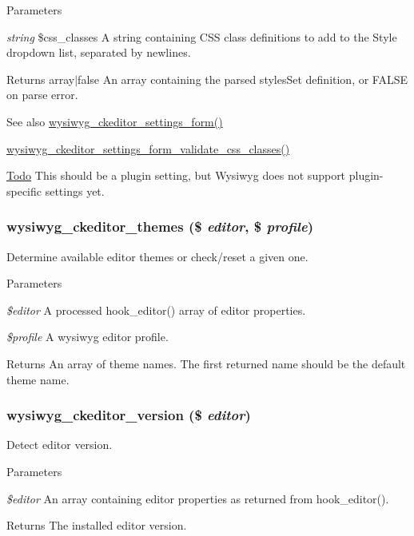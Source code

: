 \begin{DoxyParams}{Parameters}
\item[{\em string}]\$css\_\-classes A string containing CSS class definitions to add to the Style dropdown list, separated by newlines.\end{DoxyParams}
\begin{DoxyReturn}{Returns}
array$|$false An array containing the parsed stylesSet definition, or FALSE on parse error.
\end{DoxyReturn}
\begin{DoxySeeAlso}{See also}
\hyperlink{ckeditor_8inc_a99ea1c868cbd240643f8f9299b73be3f}{wysiwyg\_\-ckeditor\_\-settings\_\-form()} 

\hyperlink{ckeditor_8inc_a8b614c7b72178d43bc7028fbd35be0e2}{wysiwyg\_\-ckeditor\_\-settings\_\-form\_\-validate\_\-css\_\-classes()}
\end{DoxySeeAlso}
\begin{Desc}
\item[\hyperlink{todo__todo000061}{Todo}]This should be a plugin setting, but Wysiwyg does not support plugin-\/specific settings yet. \end{Desc}
\hypertarget{ckeditor_8inc_a69108b6a32bbebf8a2e5de05de76c039}{
\subsubsection[{wysiwyg\_\-ckeditor\_\-themes}]{\setlength{\rightskip}{0pt plus 5cm}wysiwyg\_\-ckeditor\_\-themes (\$ {\em editor}, \/  \$ {\em profile})}}
\label{ckeditor_8inc_a69108b6a32bbebf8a2e5de05de76c039}
Determine available editor themes or check/reset a given one.


\begin{DoxyParams}{Parameters}
\item[{\em \$editor}]A processed hook\_\-editor() array of editor properties. \item[{\em \$profile}]A wysiwyg editor profile.\end{DoxyParams}
\begin{DoxyReturn}{Returns}
An array of theme names. The first returned name should be the default theme name. 
\end{DoxyReturn}
\hypertarget{ckeditor_8inc_a3b5d7fe336c32260d82eb539340a5fff}{
\subsubsection[{wysiwyg\_\-ckeditor\_\-version}]{\setlength{\rightskip}{0pt plus 5cm}wysiwyg\_\-ckeditor\_\-version (\$ {\em editor})}}
\label{ckeditor_8inc_a3b5d7fe336c32260d82eb539340a5fff}
Detect editor version.


\begin{DoxyParams}{Parameters}
\item[{\em \$editor}]An array containing editor properties as returned from hook\_\-editor().\end{DoxyParams}
\begin{DoxyReturn}{Returns}
The installed editor version. 
\end{DoxyReturn}
